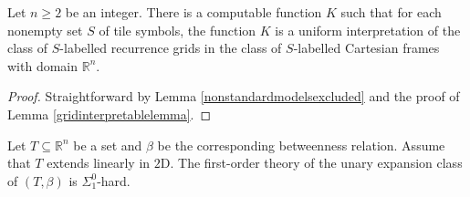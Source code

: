 \documentclass{LMCS}
\theoremstyle{plain}
\newcommand{\rsq}{\mathbb{R}^n}
\begin{document}
%
\begin{lem}\label{recurrencegridinterpr}
%
Let $n\geq 2$ be an integer.
%
There is a computable function $K$ such that for each
%
nonempty set $S$ of tile symbols, the function $K$ is a 
%
uniform interpretation of the class of $S$-labelled recurrence grids in the class of
%
$S$-labelled Cartesian frames with domain $\mathbb{R}^n$.
%
\end{lem}
\begin{proof}
Straightforward by Lemma \ref{nonstandardmodelsexcluded} and the proof of Lemma \ref{gridinterpretablelemma}.
\end{proof}
%
\begin{thm}\label{infinitelemma}
%
Let $T\subseteq \rsq$ be a set and $\beta$ be the corresponding betweenness relation. Assume that $T$ extends linearly in $\mathrm{2D}$.
%
The first-order theory of the unary expansion class of 
%
$(T,\beta)$ is $\Sigma_1^0$-hard.
%
\end{thm}
%
%
%
\end{document}
